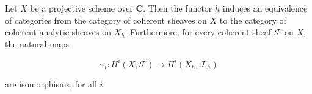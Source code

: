 Let $X$ be a projective scheme over $\mathbf{C}$. Then the functor $h$ induces an equivalence of categories from the category of coherent sheaves on $X$ to the category of coherent analytic sheaves on $X_h$. Furthermore, for every coherent sheaf $\mathcal{F}$ on $X$, the natural maps

$$\alpha_i: H^i(X, \mathcal{F}) \rightarrow H^i(X_h, \mathcal{F}_h)$$

are isomorphisms, for all $i$.
